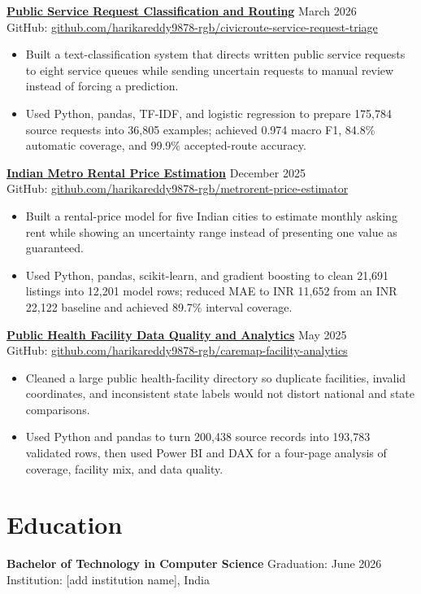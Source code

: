 \documentclass[10pt,a4paper]{article}
\newcommand{\projectheading}[4]{
  \href{#3}{\textbf{#1}} \hfill #2\\
  {\small GitHub: \href{#3}{#4}}\vspace{1pt}
}
\begin{document}
\projectheading{Public Service Request Classification and Routing}{March 2026}{https://github.com/harikareddy9878-rgb/civicroute-service-request-triage}{github.com/harikareddy9878-rgb/civicroute-service-request-triage}
\begin{itemize}
  \item Built a text-classification system that directs written public service requests to eight service queues while sending uncertain requests to manual review instead of forcing a prediction.
  \item Used Python, pandas, TF-IDF, and logistic regression to prepare 175,784 source requests into 36,805 examples; achieved 0.974 macro F1, 84.8\% automatic coverage, and 99.9\% accepted-route accuracy.
\end{itemize}

\projectheading{Indian Metro Rental Price Estimation}{December 2025}{https://github.com/harikareddy9878-rgb/metrorent-price-estimator}{github.com/harikareddy9878-rgb/metrorent-price-estimator}
\begin{itemize}
  \item Built a rental-price model for five Indian cities to estimate monthly asking rent while showing an uncertainty range instead of presenting one value as guaranteed.
  \item Used Python, pandas, scikit-learn, and gradient boosting to clean 21,691 listings into 12,201 model rows; reduced MAE to INR 11,652 from an INR 22,122 baseline and achieved 89.7\% interval coverage.
\end{itemize}

\projectheading{Public Health Facility Data Quality and Analytics}{May 2025}{https://github.com/harikareddy9878-rgb/caremap-facility-analytics}{github.com/harikareddy9878-rgb/caremap-facility-analytics}
\begin{itemize}
  \item Cleaned a large public health-facility directory so duplicate facilities, invalid coordinates, and inconsistent state labels would not distort national and state comparisons.
  \item Used Python and pandas to turn 200,438 source records into 193,783 validated rows, then used Power BI and DAX for a four-page analysis of coverage, facility mix, and data quality.
\end{itemize}

\section*{Education}
\textbf{Bachelor of Technology in Computer Science} \hfill Graduation: June 2026\\
Institution: [add institution name], India
\end{document}

